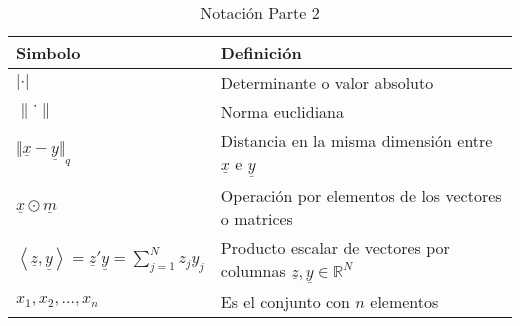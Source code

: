 \begin{table}[H]
    \begin{center}
        \begin{tabularx}{\textwidth}{|l|X|}
            \hline
            \textbf{Simbolo}                                                                                                     & \textbf{Definición}                                                                         \\
            \hline
            $ \lvert \cdot \rvert $                                                                                              & Determinante o valor absoluto                                                               \\
            $ \left\lVert \cdot \right\rVert $                                                                                   & Norma euclidiana                                                                            \\
            $ {\Vert \underline{x} - \underline{y} \Vert}_{q} $                                                                  & Distancia en la misma dimensión entre $\underline{x}$ e $\underline{y}$                     \\
            $ \underline{x} \odot \underline{m} $                                                                                & Operación por elementos de los vectores o matrices                                          \\
            $ \left\langle \underline{z}, \underline{y} \right\rangle = \underline{z}' \underline{y} = \sum_{j=1}^{N}{z_j y_j} $ & Producto escalar de vectores por columnas $\underline{z}, \underline{y} \in \mathbb{R}^{N}$ \\
            $ {x_{1}, x_{2}, \ldots ,x_{n}} $                                                                                    & Es el conjunto con $n$ elementos                                                            \\
            \hline
        \end{tabularx}
        \caption{Notación Parte 2}
        \label{tab:nnotation-part-2}
    \end{center}
\end{table}


